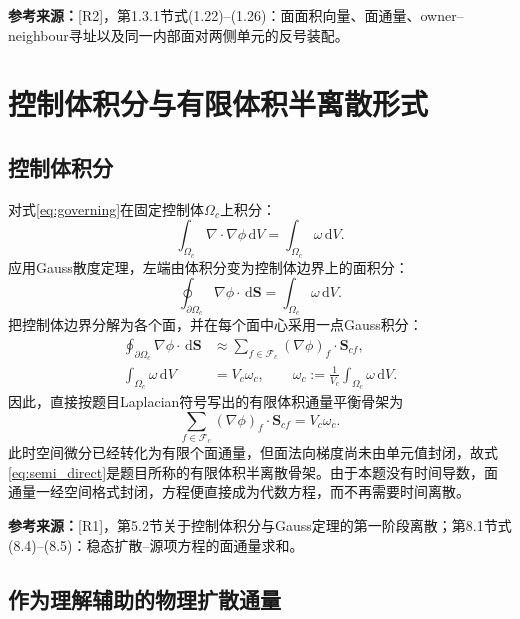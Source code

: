 \documentclass[UTF8,12pt,a4paper]{ctexart}
\numberwithin{equation}{section}
\newcommand{\dd}{\,\mathrm d}
\newcommand{\Rone}{\textnormal{[R1]}}
\newcommand{\Rtwo}{\textnormal{[R2]}}
\newcommand{\source}[1]{%
  \par\smallskip
  \noindent\colorbox{sourcebg}{%
    \parbox{0.955\linewidth}{\footnotesize\color{sourcegray}\textbf{参考来源：}#1}%
  }
  \par\smallskip
}
\begin{document}
\source{\Rtwo，第1.3.1节式(1.22)--(1.26)：面面积向量、面通量、owner--neighbour寻址以及同一内部面对两侧单元的反号装配。}

\newpage
\section{控制体积分与有限体积半离散形式}

\subsection{控制体积分}

对式\eqref{eq:governing}在固定控制体$\Omega_c$上积分：
\begin{equation}
  \int_{\Omega_c}\nabla\cdot\nabla\phi\dd V
  =\int_{\Omega_c}\omega\dd V.
  \label{eq:cell_integral}
\end{equation}
应用Gauss散度定理，左端由体积分变为控制体边界上的面积分：
\begin{equation}
  \oint_{\partial\Omega_c}\nabla\phi\cdot\dd\bm S
  =\int_{\Omega_c}\omega\dd V.
  \label{eq:gauss_integral}
\end{equation}
把控制体边界分解为各个面，并在每个面中心采用一点Gauss积分：
\begin{align}
  \oint_{\partial\Omega_c}\nabla\phi\cdot\dd\bm S
  &\approx
  \sum_{f\in\mathcal F_c}
  (\nabla\phi)_f\cdot\bm S_{cf},
  \label{eq:face_gauss}\\
  \int_{\Omega_c}\omega\dd V
  &=V_c\omega_c,
  \qquad
  \omega_c:=\frac{1}{V_c}\int_{\Omega_c}\omega\dd V.
  \label{eq:source_average}
\end{align}
因此，直接按题目Laplacian符号写出的有限体积通量平衡骨架为
\begin{equation}
  \boxed{
  \sum_{f\in\mathcal F_c}
  (\nabla\phi)_f\cdot\bm S_{cf}
  =V_c\omega_c.}
  \label{eq:semi_direct}
\end{equation}
此时空间微分已经转化为有限个面通量，但面法向梯度尚未由单元值封闭，故式\eqref{eq:semi_direct}是题目所称的有限体积半离散骨架。由于本题没有时间导数，面通量一经空间格式封闭，方程便直接成为代数方程，而不再需要时间离散。

\source{\Rone，第5.2节关于控制体积分与Gauss定理的第一阶段离散；第8.1节式(8.4)--(8.5)：稳态扩散--源项方程的面通量求和。}

\subsection{作为理解辅助的物理扩散通量}
\end{document}
